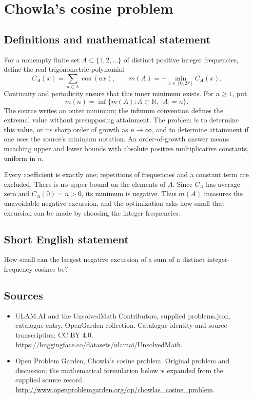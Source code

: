 \documentclass[11pt,a4paper]{article}
\begin{document}
\section*{Chowla's cosine problem}\label{statement}

\subsection{Definitions and mathematical statement}
For a nonempty finite set $A\subset\{1,2,\ldots\}$ of distinct positive
integer frequencies, define the real trigonometric polynomial
\[
 C_A(x)=\sum_{a\in A}\cos(ax),\qquad
 m(A)=-\min_{x\in[0,2\pi]}C_A(x).
\]
Continuity and periodicity ensure that this inner minimum exists. For
$n\ge1$, put
\[
 m(n)=\inf\{m(A):A\subset\mathbb N,\ |A|=n\}.
\]
The source writes an outer minimum; the infimum convention defines the
extremal value without presupposing attainment. The problem is to
determine this value, or its sharp order of growth as $n\to\infty$,
and to determine attainment if one uses the source's minimum notation.
An order-of-growth answer means matching upper and lower bounds with
absolute positive multiplicative constants, uniform in $n$.

Every coefficient is exactly one; repetitions of frequencies and a
constant term are excluded. There is no upper bound on the elements of
$A$. Since $C_A$ has average zero and $C_A(0)=n>0$, its minimum is
negative. Thus $m(A)$ measures the unavoidable negative excursion, and
the optimization asks how small that excursion can be made by choosing
the integer frequencies.
\subsection{Short English statement}
How small can the largest negative excursion of a sum of n distinct integer-frequency cosines be?
\subsection{Sources}
\begin{itemize}
\item[S1] ULAM.AI and the UnsolvedMath Contributors, supplied problems.json, catalogue entry, OpenGarden collection. Catalogue identity and source transcription; CC BY 4.0.
\url{https://huggingface.co/datasets/ulamai/UnsolvedMath}.
\item[S2] Open Problem Garden, Chowla's cosine problem. Original problem and discussion; the mathematical formulation below is expanded from the supplied source record.
\url{http://www.openproblemgarden.org/op/chowlas_cosine_problem}.
\end{itemize}
\end{document}
